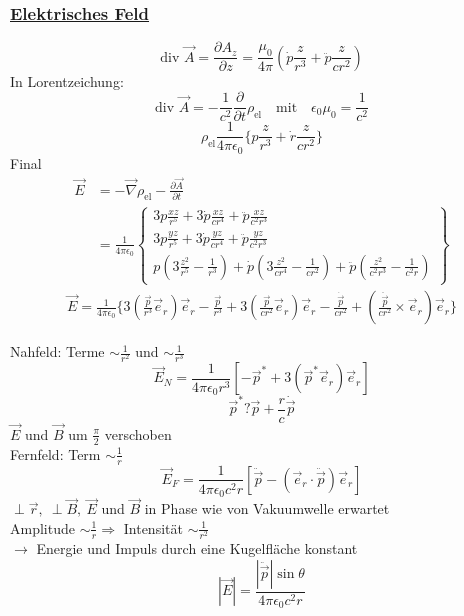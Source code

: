 \documentclass[titlepage,12pt,a4paper,ngerman]{report}
\newcommand{\tx}[1]{\textrm{#1}}
\begin{document}
\subsubsection{\underline{Elektrisches Feld}}
$$\tx{div } \vec{A} = \frac{\partial A_z}{\partial z} = \frac{\mu_0}{4 \pi} (\dot{p} \frac{z}{r^3} + \ddot{p} \frac{z}{cr^2})$$
In Lorentzeichung:
$$\tx{div } \vec{A} = - \frac{1}{c^2} \frac{\partial }{\partial t} \rho_{\tx{el}} \quad \tx{mit} \quad \epsilon_0 \mu_0 = \frac{1}{c^2}$$
$$\rho_{\tx{el}} \frac{1}{4 \pi \epsilon_0} \bigg\{ p\frac{z}{r^3} + \dot{r}\frac{z}{cr^2} \bigg\}$$
Final
\begin{align*}
\vec{E} &= - \vec{\nabla} \rho_{\tx{el}} - \frac{\partial \vec{A}}{\partial t} \\
&= \frac{1}{4 \pi \epsilon_0} \begin{Bmatrix}
3 p \frac{xz}{r^5} + 3 \dot{p} \frac{xz}{cr^4} + \ddot{p} \frac{xz}{c^2r^3} \\
3 p \frac{yz}{r^5} + 3 \dot{p} \frac{yz}{cr^4} + \ddot{p} \frac{yz}{c^2r^3} \\
p(3\frac{z^2}{r^5} - \frac{1}{r^3}) + \dot{p} (3 \frac{z^2}{cr^4} - \frac{1}{cr^2}) + \ddot{p} (\frac{z^2}{c^2r^3} - \frac{1}{c^2r})
\end{Bmatrix}
\end{align*} 
\begin{align*}
\vec{E} = \frac{1}{4 \pi \epsilon_0} \bigg\{ 3(\frac{\vec{p}}{r^3} \vec{e}_r) \vec{e}_r - \frac{\vec{p}}{r^3} + 3(\frac{\vec{p}}{cr^2} \vec{e}_r) \vec{e}_r - \frac{\dot{\vec{p}}}{cr^2} + (\frac{\ddot{\vec{p}}}{cr^2} \times \vec{e}_r) \vec{e}_r \bigg\}
\end{align*}


Nahfeld: Terme $ \sim \frac{1}{r^2} $ und $ \sim \frac{1}{r^3} $
$$\vec{E}_N = \frac{1}{4 \pi \epsilon_0 r^3} [ - \vec{p}^* + 3 ( \vec{p}^* \vec{e}_r) \vec{e}_r ]$$
$$\vec{p}^* ? \vec{p} + \frac{r}{c} \dot{\vec{p}}$$
$ \vec{E} $ und $ \vec{B} $ um $ \frac{\pi}{2} $ verschoben\\
Fernfeld: Term $ \sim \frac{1}{r} $
$$\vec{E}_F = \frac{1}{4 \pi \epsilon_0 c^2 r} [\ddot{\vec{p}} - (\vec{e}_r \cdot \ddot{\vec{p}}) \vec{e}_r]$$
$ \perp \vec{r} , \ \perp \vec{B}, \ \vec{E} $ und $ \vec{B} $ in Phase wie von Vakuumwelle erwartet\\
Amplitude $ \sim \frac{1}{r} \Rightarrow $ Intensität $ \sim \frac{1}{r^2} $\\
$ \rightarrow $ Energie und Impuls durch eine Kugelfläche konstant
$$|\vec{E}| = \frac{|\ddot{\vec{p}}| \sin \theta}{4 \pi \epsilon_0 c^2 r} $$
\end{document}
